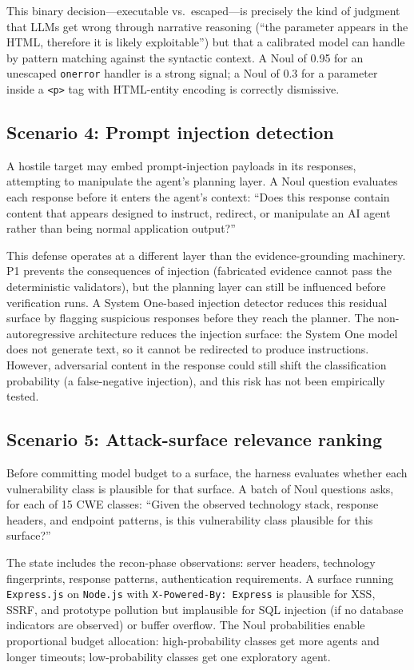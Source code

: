 \documentclass[conference]{IEEEtran}
\begin{document}
This binary decision---executable vs.\ escaped---is precisely the kind of judgment that LLMs get wrong through narrative reasoning (``the parameter appears in the HTML, therefore it is likely exploitable'') but that a calibrated model can handle by pattern matching against the syntactic context. A Noul of 0.95 for an unescaped \texttt{onerror} handler is a strong signal; a Noul of 0.3 for a parameter inside a \texttt{<p>} tag with HTML-entity encoding is correctly dismissive.

\subsection{Scenario 4: Prompt injection detection}

A hostile target may embed prompt-injection payloads in its responses, attempting to manipulate the agent's planning layer. A Noul question evaluates each response before it enters the agent's context: ``Does this response contain content that appears designed to instruct, redirect, or manipulate an AI agent rather than being normal application output?''

This defense operates at a different layer than the evidence-grounding machinery. P1 prevents the consequences of injection (fabricated evidence cannot pass the deterministic validators), but the planning layer can still be influenced before verification runs. A System One-based injection detector reduces this residual surface by flagging suspicious responses before they reach the planner. The non-autoregressive architecture reduces the injection surface: the System One model does not generate text, so it cannot be redirected to produce instructions. However, adversarial content in the response could still shift the classification probability (a false-negative injection), and this risk has not been empirically tested.

\subsection{Scenario 5: Attack-surface relevance ranking}

Before committing model budget to a surface, the harness evaluates whether each vulnerability class is plausible for that surface. A batch of Noul questions asks, for each of 15 CWE classes: ``Given the observed technology stack, response headers, and endpoint patterns, is this vulnerability class plausible for this surface?''

The state includes the recon-phase observations: server headers, technology fingerprints, response patterns, authentication requirements. A surface running \texttt{Express.js} on \texttt{Node.js} with \texttt{X-Powered-By: Express} is plausible for XSS, SSRF, and prototype pollution but implausible for SQL injection (if no database indicators are observed) or buffer overflow. The Noul probabilities enable proportional budget allocation: high-probability classes get more agents and longer timeouts; low-probability classes get one exploratory agent.
\end{document}
